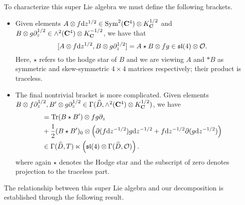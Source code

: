 \documentclass[../main.tex]{subfiles}
\begin{document}
To characterize this super Lie algebra we must define the following brackets.
\begin{itemize}
\item Given elements $A \otimes f \mathrm{d} z^{1/2}\in \text{Sym}^2 (\mathbf{C}^4)\otimes K^{1/2}_{\mathbf{C}}$ and $B\otimes g \partial_z^{1/2}\in \wedge^2 (\mathbf{C}^4)\otimes K^{-1/2}_{\mathbf{C}}$, we have that
\[
[A \otimes f \mathrm{d} z^{1/2}, B\otimes g \partial_z^{1/2}] = A \star B \otimes fg \in \mathfrak{sl}(4)\otimes \mathcal{O}.
\]
Here, $\star$ refers to the hodge star of $B$ and we are viewing $A$ and $*B$ as symmetric and skew-symmetric $4\times 4$ matrices respectively; their product is traceless. 

\item The final nontrivial bracket is more complicated. 
Given elements $B \otimes f \partial_z^{1/2}, B'\otimes g \partial_z^{1/2} \in \Gamma( \widehat D, \wedge^2 (\mathbf{C}^4) \otimes K^{1/2}_{\mathbf{C}})$, we have
\begin{align*}
[B\otimes f \d z^{-1/2} , B' \otimes g \d z^{-1/2} ] & = \tr (B \star B') \otimes fg \del_z \\ & + \frac12 (B \star B')_0 \otimes \left (\del (f \d z^{-1/2} ) g \d z^{-1/2} + f \d z^{-1/2} \del (g \d z^{-1/2} ) \right ) \\
& \in \Gamma (\hat D, T) \ltimes \left (\mf {sl}(4) \otimes \Gamma (\hat D, \mc O) \right ) .
\end{align*}
where again $\star$ denotes the Hodge star and the subscript of zero denotes projection to the traceless part. 

\end{itemize}

The relationship between this super Lie algebra and our decomposition is established through the following result.
\end{document}
